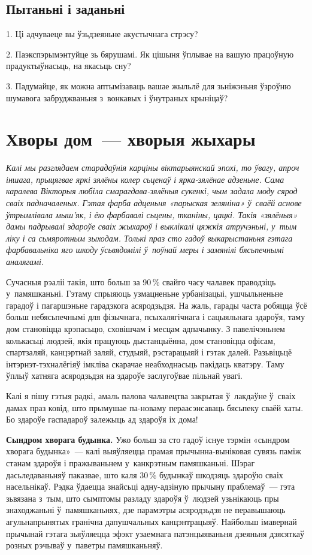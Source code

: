 \subsection*{Пытаньні і заданьні}

1. Ці адчуваеце вы ўзьдзеяньне акустычнага стрэсу?

2. Паэкспэрымэнтуйце зь бярушамі. Як цішыня ўплывае на вашую працоўную прадуктыўнасьць, на якасьць сну?

3. Падумайце, як можна аптымізаваць вашае жыльлё для зьніжэньня ўзроўню шумавога забруджваньня з~вонкавых і ўнутраных крыніцаў?


\section{Хворы дом~--- хворыя жыхары}

\emph{Калі мы разглядаем старадаўнія карціны віктарыянскай эпохі, то ўвагу, апроч іншага, прыцягвае яркі зялёны колер сьценаў і ярка-зялёнае адзеньне. Сама каралева Вікторыя любіла смарагдава-зялёныя сукенкі, чым задала моду сярод сваіх падначаленых. Гэтая фарба адценьня «парыская зеляніна» ў~сваёй аснове ўтрымлівала мыш'як, і ёю фарбавалі сьцены, тканіны, цацкі. Такія «зялёныя» дамы падрывалі здароўе сваіх жыхароў і выклікалі цяжкія атручэньні, у~тым ліку і са сьмяротным зыходам. Толькі праз сто гадоў выкарыстаньня гэтага фарбавальніка яго шкоду ўсьвядомілі ў~поўнай меры і замянілі бясьпечнымі аналягамі.}

Сучасныя рэаліі такія, што больш за 90\,\% свайго часу чалавек праводзіць у~памяшканьні. Гэтаму спрыяюць узмацненьне урбанізацыі, ушчыльненьне гарадоў і пагаршэньне гарадзкога асяродзьдзя. На жаль, гарады часта робяцца ўсё больш небясьпечнымі для фізычнага, псыхалягічнага і сацыяльнага здароўя, таму дом становіцца крэпасьцю, сховішчам і месцам адпачынку. З павелічэньнем колькасьці людзей, якія працуюць дыстанцыённа, дом становіцца офісам, спартзаляй, канцэртнай заляй, студыяй, рэстарацыяй і гэтак далей. Разьвіцьцё інтэрнэт-тэхналёгіяў імкліва скарачае неабходнасьць пакідаць кватэру. Таму ўплыў хатняга асяродзьдзя на здароўе заслугоўвае пільнай увагі.

Калі я пішу гэтыя радкі, амаль палова чалавецтва закрытая ў~лакдаўне ў~сваіх дамах праз ковід, што прымушае па-новаму пераасэнсаваць бясьпеку сваёй хаты. Бо здароўе гаспадароў залежыць ад здароўя іх дома!

\textbf{Сындром хворага будынка.} Ужо больш за сто гадоў існуе тэрмін «сындром хворага будынка»~--- калі выяўляецца прамая прычынна-выніковая сувязь паміж станам здароўя і пражываньнем у~канкрэтным памяшканьні. Шэраг дасьледаваньняў паказвае, што каля 30\,\% будынкаў шкодзяць здароўю сваіх насельнікаў. Рэдка ўдаецца знайсьці адну-адзіную прычыну праблемаў~--- гэта зьвязана з~тым, што сымптомы разладу здароўя ў~людзей узьнікаюць пры знаходжаньні ў~памяшканьнях, дзе парамэтры асяродзьдзя не перавышаюць агульнапрынятых гранічна дапушчальных канцэнтрацыяў. Найбольш імавернай прычынай гэтага зьяўляецца эфэкт узаемнага патэнцыяваньня дзеяньня дзясяткаў розных рэчываў у~паветры памяшканьняў.

